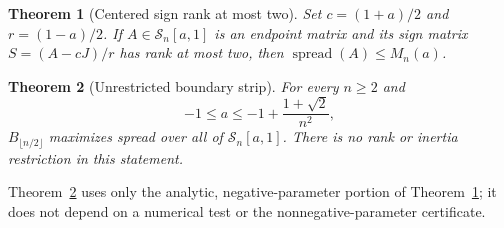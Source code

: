 \documentclass[11pt]{article}
\newtheorem{theorem}{Theorem}
\newcommand{\spn}{\operatorname{spread}}
\begin{document}
\begin{theorem}[Centered sign rank at most two]\label{thm:centered}
Set $c=(1+a)/2$ and $r=(1-a)/2$. If $A\in\mathcal S_n[a,1]$ is an endpoint
matrix and its sign matrix $S=(A-cJ)/r$ has rank at most two, then
$\spn(A)\le M_n(a)$.
\end{theorem}

\begin{theorem}[Unrestricted boundary strip]\label{thm:strip}
For every $n\ge2$ and
\[
 -1\le a\le -1+\frac{1+\sqrt2}{n^2},
\]
$B_{\lfloor n/2\rfloor}$ maximizes spread over all of $\mathcal S_n[a,1]$.
There is no rank or inertia restriction in this statement.
\end{theorem}
Theorem~\ref{thm:strip} uses only the analytic, negative-parameter portion of
Theorem~\ref{thm:centered}; it does not depend on a numerical test or the
nonnegative-parameter certificate.
\end{document}
